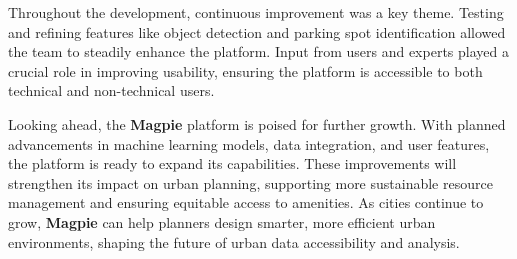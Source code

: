 Throughout the development, continuous improvement was a key theme. Testing and
refining features like object detection and parking spot identification allowed
the team to steadily enhance the platform. Input from users and experts played a
crucial role in improving usability, ensuring the platform is accessible to both
technical and non{-}technical users.

Looking ahead, the \textbf{Magpie} platform is poised for further growth. With
planned advancements in machine learning models, data integration, and user
features, the platform is ready to expand its capabilities. These improvements
will strengthen its impact on urban planning, supporting more sustainable
resource management and ensuring equitable access to amenities. As cities
continue to grow, \textbf{Magpie} can help planners design smarter, more
efficient urban environments, shaping the future of urban data accessibility and
analysis.

\newpage{}